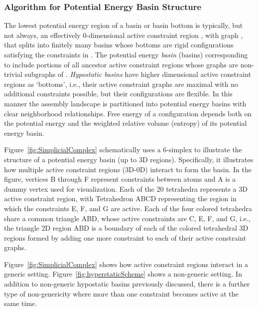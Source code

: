 \documentclass[]{article}
\newcommand{\figref}[1]{Figure~\ref{#1}}
\begin{document}
\subsubsection{Algorithm for Potential Energy Basin Structure}
\label{sec:methods:BasinStructure}
The lowest potential energy region of a basin or basin bottom is typically, but
not always, an effectively 0-dimensional active constraint region , with
graph , that splits into finitely many basins whose bottoms are rigid configurations 
satisfying the constraints in . The potential
energy \emph{basin} (basins) corresponding to  include portions of all ancestor active
constraint regions whose graphs are non-trivial subgraphs of .
\emph{Hypostatic basins} have higher dimensional active constraint regions as
`bottoms', i.e., their active constraint graphs are maximal with no additional
constraints possible, but their configurations are flexible.  In this manner the
assembly landscape is partitioned into potential energy basins with clear
neighborhood relationships.  Free energy of a configuration depends both on the
potential energy and the weighted relative volume (entropy) of its potential
energy basin.

\figref{fig:SimplicialComplex} schematically uses a 6-simplex to illustrate the
structure of a potential energy basin (up to 3D regions). Specifically, it illustrates how
multiple active constraint regions (3D-0D) interact to form the basin. In the
figure, vertices B through F represent constraints between atoms and A is a
dummy vertex used for visualization. Each of the 20 tetrahedra represents a 3D
active constraint region, with Tetrahedron ABCD representing the region in
which the constraints E, F, and G are active. Each of the four colored
tetrahedra share a common triangle ABD, whose active constraints are C, E, F,
and G, i.e., the triangle 2D region ABD is a boundary of each of the colored
tetrahedral 3D regions formed by adding one more constraint to each of their
active constraint graphs.

\figref{fig:SimplicialComplex} shows how active constraint regions interact in
a generic setting. \figref{fig:hyperstaticScheme} shows a non-generic setting.
In addition to non-generic hypostatic basins previously discussed, there is a
further type of non-genericity where more than one
constraint becomes active at the same time. 
\end{document}
